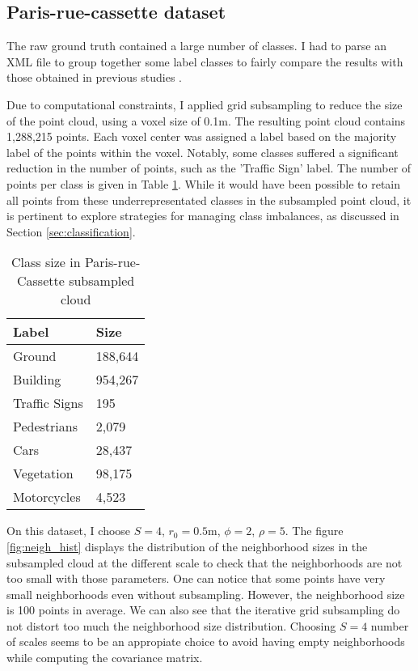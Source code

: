 \documentclass{article}
\begin{document}
\subsection{Paris-rue-cassette dataset}
The raw ground truth contained a large number of classes. I had to parse an XML file to group together some label classes to fairly compare the results with those obtained in previous studies \cite{thomas_semantic_2018,hackel_fast_nodate,weinmann_semantic_2015}. 

Due to computational constraints, I applied grid subsampling to reduce the size of the point cloud, using a voxel size of 0.1m. The resulting point cloud contains 1,288,215 points. Each voxel center was assigned a label based on the majority label of the points within the voxel. Notably, some classes suffered a significant reduction in the number of points, such as the 'Traffic Sign' label. The number of points per class is given in Table \ref{tab:cassette_label_size}. While it would have been possible to retain all points from these underrepresentated classes in the subsampled point cloud, it is pertinent to explore strategies for managing class imbalances, as discussed in Section \ref{sec:classification}.

\begin{table}[H]
    \begin{center}
            \begin{tabular}{ll}
                    Label & Size \\
                    \hline
                    Ground & 188,644 \\
                    Building & 954,267 \\
                    Traffic Signs & 195 \\
                    Pedestrians & 2,079 \\
                    Cars & 28,437 \\
                    Vegetation & 98,175 \\
                    Motorcycles & 4,523 \\
            \end{tabular}
    \end{center}
    \caption{Class size in Paris-rue-Cassette subsampled cloud}
    \label{tab:cassette_label_size}
\end{table}

On this dataset, I choose $S=4$, $r_0=0.5$m, $\phi=2$, $\rho=5$. The figure \ref{fig:neigh_hist} displays the distribution of the neighborhood sizes in the subsampled cloud at the different scale to check that the neighborhoods are not too small with those parameters. One can notice that some points have very small neighborhoods even without subsampling. However, the neighborhood size is 100 points in average. We can also see that the iterative grid subsampling do not distort too much the neighborhood size distribution. Choosing $S=4$ number of scales seems to be an appropiate choice to avoid having empty neighborhoods while computing the covariance matrix. 
\end{document}
